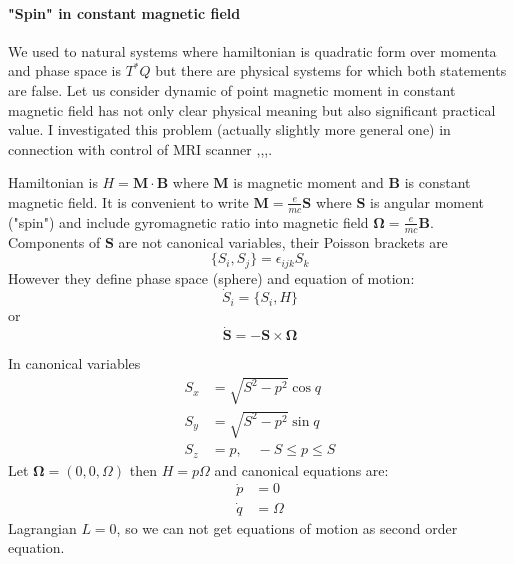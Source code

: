 \paragraph{"Spin" in constant magnetic field}
\label{par:cm-spin}
We used to natural systems where hamiltonian is quadratic form over momenta and
phase space is $T^*Q$ 
but there are physical systems for which both statements are false.
Let us consider 
dynamic of point magnetic moment in constant magnetic field has not only
clear physical meaning but also significant practical value. I investigated
this problem (actually slightly more general one) in connection with control of MRI
scanner \cite{RPZ4},\cite{RPZ3},\cite{RPZ2},\cite{RPZ1}.


Hamiltonian is $ H=\bm M \cdot \bm B $ where $\bm M$ is magnetic moment 
and $ \bm B $ is constant magnetic field.
It is convenient to write $ \bm M=\frac{e}{m c}\bm S $ where $ \bm S $
is angular moment ("spin")  and  include gyromagnetic ratio into magnetic field
$ \bm \Omega = \frac{e}{m c}\bm B$. Components of $ \bm S $ are not
canonical variables, their Poisson brackets are
\begin{equation}
   \label {pb}
    \{S_i,S_j\}= \epsilon_{ijk} S_k
\end{equation}
However they define phase space (sphere)  and equation of motion:
\begin{equation}
   \label {sp1}
    \dot S_i=\{S_i,H\}
\end{equation} 
or 
\begin{equation}
   \label {sp2}
    \dot {\bm S} =-\bm S \times \bm \Omega
\end{equation}

In canonical variables 
\begin{equation}
   \label {sp3}
   \begin{split}
       S_x & = \sqrt{S^2-p^2} \cos q \\
       S_y & = \sqrt{S^2-p^2} \sin q \\
       S_z & = p,\quad -S\le p \le S
   \end{split}
\end{equation}
Let $ \bm \Omega =(0,0, \Omega) $ then $ H=p \Omega $ and canonical equations are:
\begin{equation}
   \label {sp4}
   \begin{split}
       \dot p & =0\\
       \dot q & = \Omega
   \end{split}
\end{equation}
Lagrangian $ L=0 $, so we can not get equations of motion as second order equation.

